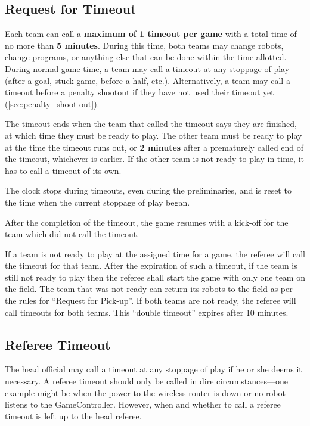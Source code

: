 \subsection{Request for Timeout}
\label{sec:request_for_timeout}

Each team can call a \textbf{maximum of 1 timeout per game} with a total time of no more than \textbf{5 minutes}.
During this time, both teams may change robots, change programs, or anything else that can be done within the time allotted.
During normal game time, a team may call a timeout at any stoppage of play (after a goal, stuck game, before a half, etc.).
Alternatively, a team may call a timeout before a penalty shootout if they have not used their timeout yet (\cf \cref{sec:penalty_shoot-out}).

The timeout ends when the team that called the timeout says they are finished, at which time they must be ready to play.
The other team must be ready to play at the time the timeout runs out, or \textbf{2 minutes} after a prematurely called end of the timeout, whichever is earlier.
If the other team is not ready to play in time, it has to call a timeout of its own.

The clock stops during timeouts, even during the preliminaries, and is reset to the time when the current stoppage of play began.

After the completion of the timeout, the game resumes with a kick-off for the team which did not call the timeout.

If a team is not ready to play at the assigned time for a game, the referee will call the timeout for that team.
After the expiration of such a timeout, if the team is still not ready to play then the referee shall start the game with only one team on the field.
The team that was not ready can return its robots to the field as per the rules for ``Request for Pick-up''.
If both teams are not ready, the referee will call timeouts for both teams.
This ``double timeout'' expires after 10 minutes.

\subsection{Referee Timeout}
\label{sec:referee_timeout}

The head official may call a timeout at any stoppage of play if he or she deems it necessary.
A referee timeout should only be called in dire circumstances---one example might be when the power to the wireless router is down or no robot listens to the GameController.
However, when and whether to call a referee timeout is left up to the head referee.

